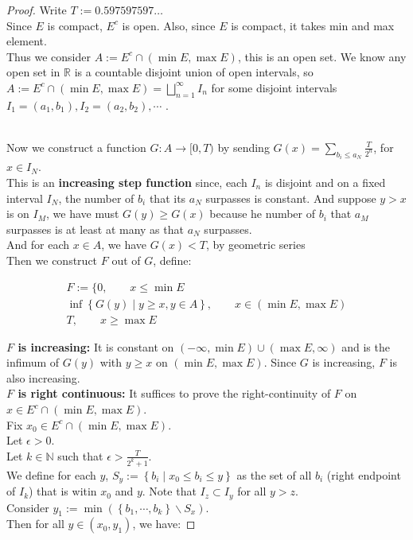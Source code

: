 \documentclass{qlnotes-export}
\begin{document}
\begin{proof}

Write \(T := 0.597597597\ldots\)\\
Since \(E\) is compact, \(E^{c}\) is open. Also, since \(E\) is compact, it takes min and max element.\\
Thus we consider \(A := E^{c} \cap (\min E,\max E)\), this is an open set. We know any open set in \(\mathbb{R}\) is a countable disjoint union of open intervals, so \(A := E^{c} \cap (\min E,\max E) = \bigsqcup_{n = 1}^{\infty}I_{n}\) for some disjoint intervals \(I_{1} = (a_{1},b_{1}),I_{2} = (a_{2},b_{2}),\cdots\) .\\
\strut \\
Now we construct a function \(G:A\rightarrow\lbrack 0,T)\) by sending \(G(x) = \sum_{b_{i} \leq a_{N}}\frac{T}{2^{n}}\), for \(x \in I_{N}\).\\
This is an \textbf{increasing step function} since, each \(I_{n}\) is disjoint and on a fixed interval \(I_{N}\), the number of \(b_{i}\) that its \(a_{N}\) surpasses is constant. And suppose \(y > x\) is on \(I_{M}\), we have must \(G(y) \geq G(x)\) because he number of \(b_{i}\) that \(a_{M}\) surpasses is at least at many as that \(a_{N}\) surpasses.\\
And for each \(x \in A\), we have \textbf{\(G(x) < T\)}, by geometric series\\
Then we construct \(F\) out of \(G\), define:

\[\begin{matrix}
{F := \{ 0,\quad\quad x \leq \min E} \\
{\inf\left\{ {G(y) \mid y \geq x,y \in A} \right\},\quad\quad x \in (\min E,\max E)} \\
{T,\quad\quad x \geq \max E}
\end{matrix}\]

\textbf{\(F\) is increasing:} It is constant on \(( - \infty,\min E) \cup (\max E,\infty)\) and is the infimum of \(G(y)\) with \(y \geq x\) on \((\min E,\max E)\). Since \(G\) is increasing, \(F\) is also increasing.\\
\textbf{\(F\) is right continuous:} It suffices to prove the right-continuity of \(F\) on \(x \in E^{c} \cap (\min E,\max E)\).\\
Fix \(x_{0} \in E^{c} \cap (\min E,\max E)\).\\
Let \(\epsilon > 0\).\\
Let \(k \in {\mathbb{N}}\) such that \(\epsilon > \frac{T}{2^{k} + 1}\).\\
We define for each \(y\), \(S_{y} := \left\{ {b_{i} \mid x_{0} \leq b_{i} \leq y} \right\}\) as the set of all \(b_{i}\) (right endpoint of \(I_{k}\)) that is witin \(x_{0}\) and \(y\). Note that \(I_{z} \subset I_{y}\) for all \(y > z\).\\
Consider \(y_{1} := \min(\left\{ {b_{1},\cdots,b_{k}} \right\}\backslash S_{x})\).\\
Then for all \(y \in (x_{0},y_{1})\), we have:


\end{proof}
\end{document}
